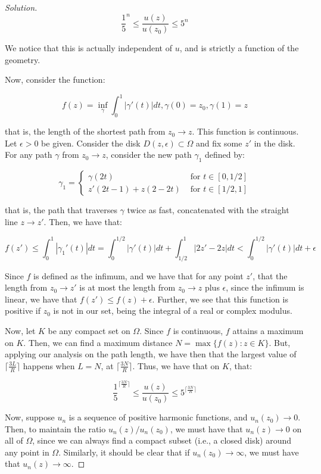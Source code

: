 \documentclass[10pt]{article}
\begin{document}
\begin{proof}[Solution]
$$  \frac{1}{5}^n  \leq  \frac{u(z)}{u(z_0)} \leq  5^n$$

We notice that this is actually independent of $u$, and is strictly a function of the geometry.

Now, consider the function:

$$ f(z) = \inf_{\gamma} \int_0^1 | \gamma'(t) | dt, \gamma(0) = z_0, \gamma(1) = z$$

that is, the length of the shortest path from $z_0 \to z$. This function is continuous. Let $\epsilon > 0$ be given. Consider the disk $D(z,\epsilon) \subset \Omega$ and fix some $z'$ in the disk. For any path $\gamma$ from $z_0 \to z$, consider the new path $\gamma_1$ defined by:

$$ \gamma_1 = \begin{cases} \gamma(2t) & \text{ for } t \in [0,1/2] \\ z'(2t - 1)  + z(2 - 2t) & \text{ for } t \in [1/2,1] \end{cases} $$

that is, the path that traverses $\gamma$ twice as fast, concatenated with the straight line $z \to z'$. Then, we have that:

$$ f(z') \leq \int_0^1 | \gamma_1'(t) | dt = \int_0^{1/2} | \gamma'(t) | dt + \int_{1/2}^1 | 2z' - 2z | dt < \int_0^{1/2} | \gamma'(t) | dt  + \epsilon $$

Since $f$ is defined as the infimum, and we have that for any point $z'$, that the length from $z_0 \to z'$ is at most the length from $z_0 \to z$ plus $\epsilon$, since the infimum is linear, we have that $f(z') \leq f(z) + \epsilon$. Further, we see that this function is positive if $z_0$ is not in our set, being the integral of a real or complex modulus.

Now, let $K$ be any compact set on $\Omega$. Since $f$ is continuous, $f$ attains a maximum on $K$. Then, we can find a maximum distance $N = \max\{ f(z) : z \in K \}$. But, applying our analysis on the path length, we have then that the largest value of $\lceil \frac{3L}{R} \rceil$ happens when $L =N$, at $\lceil \frac{3N}{R} \rceil$. Thus, we have that on $K$, that:

$$   \frac{1}{5}^{\lceil \frac{3N}{R} \rceil}  \leq  \frac{u(z)}{u(z_0)} \leq  5^{\lceil \frac{3N}{R} \rceil} $$

Now, suppose $u_n$ is a sequence of positive harmonic functions, and $u_n(z_0) \to 0$. Then, to maintain the ratio $u_n(z)/u_n(z_0)$, we must have that $u_n(z) \to 0$ on all of $\Omega$, since we can always find a compact subset (i.e., a closed disk) around any point in $\Omega$. Similarly, it should be clear that if $u_n(z_0) \to \infty$, we must have that $u_n(z) \to \infty$.


\end{proof}
\end{document}

